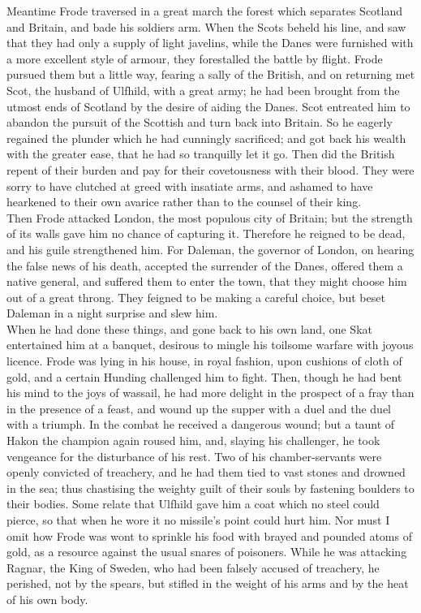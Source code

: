 \documentclass[10pt,a4paper]{report}
\begin{document}
Meantime Frode traversed in a great march the forest which separates Scotland and Britain, and bade his soldiers arm. When the Scots beheld his line, and saw that they had only a supply of light javelins, while the Danes were furnished with a more excellent style of armour, they forestalled the battle by flight. Frode pursued them but a little way, fearing a sally of the British, and on returning met Scot, the husband of Ulfhild, with a great army; he had been brought from the utmost ends of Scotland by the desire of aiding the Danes. Scot entreated him to abandon the pursuit of the Scottish and turn back into Britain. So he eagerly regained the plunder which he had cunningly sacrificed; and got back his wealth with the greater ease, that he had so tranquilly let it go. Then did the British repent of their burden and pay for their covetousness with their blood. They were sorry to have clutched at greed with insatiate arms, and ashamed to have hearkened to their own avarice rather than to the counsel of their king.\\

Then Frode attacked London, the most populous city of Britain; but the strength of its walls gave him no chance of capturing it. Therefore he reigned to be dead, and his guile strengthened him. For Daleman, the governor of London, on hearing the false news of his death, accepted the surrender of the Danes, offered them a native general, and suffered them to enter the town, that they might choose him out of a great throng. They feigned to be making a careful choice, but beset Daleman in a night surprise and slew him.\\

When he had done these things, and gone back to his own land, one Skat entertained him at a banquet, desirous to mingle his toilsome warfare with joyous licence. Frode was lying in his house, in royal fashion, upon cushions of cloth of gold, and a certain Hunding challenged him to fight. Then, though he had bent his mind to the joys of wassail, he had more delight in the prospect of a fray than in the presence of a feast, and wound up the supper with a duel and the duel with a triumph. In the combat he received a dangerous wound; but a taunt of Hakon the champion again roused him, and, slaying his challenger, he took vengeance for the disturbance of his rest. Two of his chamber-servants were openly convicted of treachery, and he had them tied to vast stones and drowned in the sea; thus chastising the weighty guilt of their souls by fastening boulders to their bodies. Some relate that Ulfhild gave him a coat which no steel could pierce, so that when he wore it no missile's point could hurt him. Nor must I omit how Frode was wont to sprinkle his food with brayed and pounded atoms of gold, as a resource against the usual snares of poisoners. While he was attacking Ragnar, the King of Sweden, who had been falsely accused of treachery, he perished, not by the spears, but stifled in the weight of his arms and by the heat of his own body.\\
\end{document}
